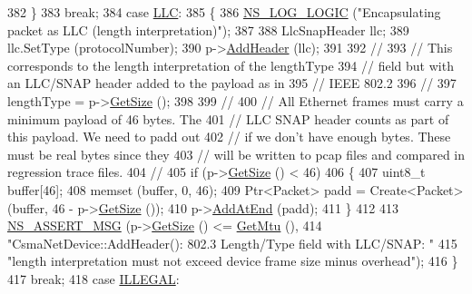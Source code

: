 \begin{DoxyCode}
382         \}
383       \textcolor{keywordflow}{break};
384     \textcolor{keywordflow}{case} \hyperlink{classns3_1_1CsmaNetDevice_a176431468055d41f8e879e33a5362cadab3a0dd08ede5405aff1fd939e556dc5b}{LLC}: 
385       \{
386         \hyperlink{group__logging_ga88acd260151caf2db9c0fc84997f45ce}{NS\_LOG\_LOGIC} (\textcolor{stringliteral}{"Encapsulating packet as LLC (length interpretation)"});
387 
388         LlcSnapHeader llc;
389         llc.SetType (protocolNumber);
390         p->\hyperlink{classns3_1_1Packet_a465108c595a0bc592095cbcab1832ed8}{AddHeader} (llc);
391 
392         \textcolor{comment}{//}
393         \textcolor{comment}{// This corresponds to the length interpretation of the lengthType }
394         \textcolor{comment}{// field but with an LLC/SNAP header added to the payload as in }
395         \textcolor{comment}{// IEEE 802.2}
396         \textcolor{comment}{//}
397         lengthType = p->\hyperlink{classns3_1_1Packet_a462855c9929954d4301a4edfe55f4f1c}{GetSize} ();
398 
399         \textcolor{comment}{//}
400         \textcolor{comment}{// All Ethernet frames must carry a minimum payload of 46 bytes.  The }
401         \textcolor{comment}{// LLC SNAP header counts as part of this payload.  We need to padd out}
402         \textcolor{comment}{// if we don't have enough bytes.  These must be real bytes since they }
403         \textcolor{comment}{// will be written to pcap files and compared in regression trace files.}
404         \textcolor{comment}{//}
405         \textcolor{keywordflow}{if} (p->\hyperlink{classns3_1_1Packet_a462855c9929954d4301a4edfe55f4f1c}{GetSize} () < 46)
406           \{
407             uint8\_t buffer[46];
408             memset (buffer, 0, 46);
409             Ptr<Packet> padd = Create<Packet> (buffer, 46 - p->\hyperlink{classns3_1_1Packet_a462855c9929954d4301a4edfe55f4f1c}{GetSize} ());
410             p->\hyperlink{classns3_1_1Packet_a14ec3d4250b425468764de58f5837b6b}{AddAtEnd} (padd);
411           \}
412 
413         \hyperlink{assert_8h_aff5ece9066c74e681e74999856f08539}{NS\_ASSERT\_MSG} (p->\hyperlink{classns3_1_1Packet_a462855c9929954d4301a4edfe55f4f1c}{GetSize} () <= \hyperlink{classns3_1_1CsmaNetDevice_a4c27c177803c2efbea66c14b66babd84}{GetMtu} (),
414                        \textcolor{stringliteral}{"CsmaNetDevice::AddHeader(): 802.3 Length/Type field with LLC/SNAP: "}
415                        \textcolor{stringliteral}{"length interpretation must not exceed device frame size minus overhead"});
416       \}
417       \textcolor{keywordflow}{break};
418     \textcolor{keywordflow}{case} \hyperlink{classns3_1_1CsmaNetDevice_a176431468055d41f8e879e33a5362cada1f230eaef80ea65f838f089c07981bad}{ILLEGAL}:

\end{DoxyCode}

